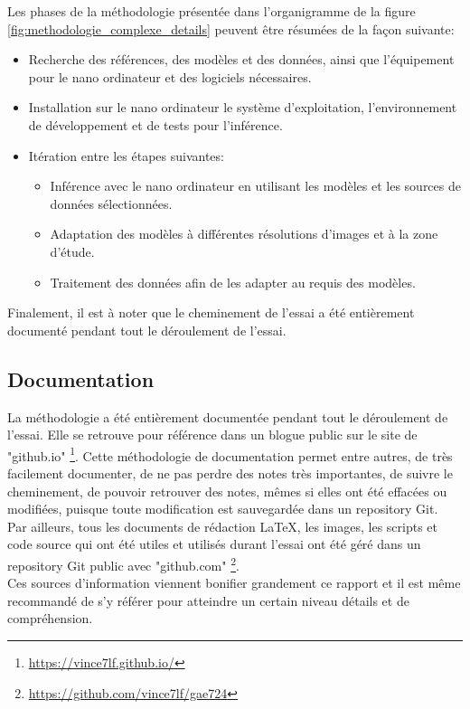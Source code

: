 \noindent Les phases de la méthodologie présentée dans l'organigramme de la figure \ref{fig:methodologie_complexe_details} peuvent être résumées de la façon suivante:
\begin{itemize}
   \item Recherche des références, des modèles et des données, ainsi que l'équipement pour le nano ordinateur et des logiciels nécessaires.
   \item Installation sur le nano ordinateur le système d'exploitation, l'environnement de développement et de tests pour l'inférence.
   \item Itération entre les étapes suivantes:
   \begin{itemize}
      \item Inférence avec le nano ordinateur en utilisant les modèles et les sources de données sélectionnées.
      \item Adaptation des modèles à différentes résolutions d'images et à la zone d'étude.
      \item Traitement des données afin de les adapter au requis des modèles.
   \end{itemize}
\end{itemize}
\vspace{\baselineskip}
\noindent Finalement, il est à noter  que le cheminement de l'essai a été entièrement documenté pendant tout le déroulement de l'essai.
\subsection{Documentation}
\noindent La méthodologie a été entièrement documentée pendant tout le déroulement de l'essai. Elle se retrouve pour référence dans un blogue public sur le site de "github.io" \footnote{\url{https://vince7lf.github.io/}}. Cette méthodologie de documentation permet entre autres, de très facilement documenter, de ne pas perdre des notes très importantes, de suivre le cheminement, de pouvoir retrouver des notes, mêmes si elles ont été effacées ou modifiées, puisque toute modification est sauvegardée dans un repository Git.
\vspace{\baselineskip}
\\
\noindent Par ailleurs, tous les documents de rédaction LaTeX, les images, les scripts et code source qui ont été utiles et utilisés durant l'essai ont été géré dans un repository Git public avec "github.com" \footnote{\url{https://github.com/vince7lf/gae724}}. 
\vspace{\baselineskip}
\\
\noindent Ces sources d'information viennent bonifier grandement ce rapport et il est même recommandé de s'y référer pour atteindre un certain niveau détails et de compréhension. 
